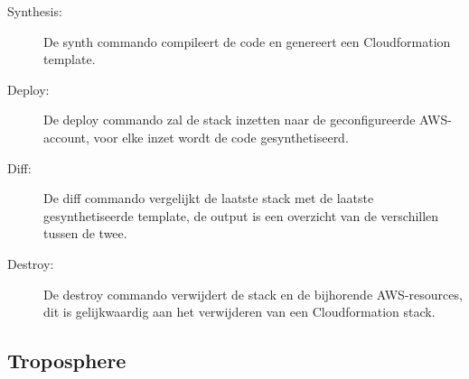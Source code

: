 \begin{description}
    \item[Synthesis:] De synth commando compileert de code en genereert een Cloudformation template.
    \item[Deploy:] De deploy commando zal de stack inzetten naar de geconfigureerde AWS-account, voor elke inzet wordt de code gesynthetiseerd.
    \item[Diff:] De diff commando vergelijkt de laatste stack met de laatste gesynthetiseerde template, de output is een overzicht van de verschillen tussen de twee.
    \item[Destroy:] De destroy commando verwijdert de stack en de bijhorende AWS-resources, dit is gelijkwaardig aan het verwijderen van een Cloudformation stack.
\end{description}

\subsection{Troposphere}
\label{sec:service-troposphere}